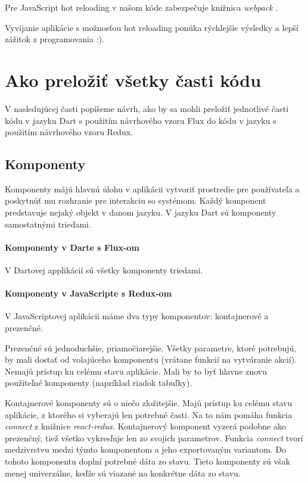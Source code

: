 Pre JavaScript hot reloading v našom kóde zabezpečuje knižnica \emph{webpack} \cite{webpack}.

Vyvíjanie aplikácie s možnosťou hot reloading ponúka rýchlejšie výsledky a lepší zážitok z programovania :).

\section{Ako preložiť všetky časti kódu}

\NEW{}
V nasledujúcej časti popíšeme návrh, ako by sa mohli preložiť jednotlivé časti kódu v jazyku Dart s použitím návrhového vzoru Flux do kódu v jazyku \JS{} s použitím návrhového vzoru Redux.

\subsection{Komponenty}
Komponenty májú hlavnú úlohu v aplikácii vytvoriť prostredie pre používateľa a poskytnúť mu rozhranie pre interakciu so systémom. Každý komponent predstavuje nejaký objekt v danom jazyku. V jazyku Dart sú komponenty samostatnými triedami.



\paragraph{Komponenty v Darte s Flux-om}
V Dartovej applikácií sú všetky komponenty triedami.

\paragraph{Komponenty v JavaScripte s Redux-om}
V JavaScriptovej aplikácii máme dva typy komponentov: kontajnerové a prezenčné. 

Prezenčné sú jednoduchšie, priamočiarejšie. Všetky parametre, ktoré potrebujú, by mali dostať od volajúceho komponentu (vrátane funkcií na vytváranie akcií). Nemajú prístup ku celému stavu aplikácie. Mali by to byť hlavne znovu použiteľné komponenty (napríklad riadok tabuľky).

Kontajnerové komponenty sú o niečo zložitejšie. Majú prístup ku celému stavu aplikácie, z ktorého si vyberajú len potrebné časti. Na to nám pomáha funkcia \emph{connect} z knižnice \emph{react-redux}. Kontajnerový komponent vyzerá podobne ako prezenčný, tiež všetko vykresľuje len zo svojich parametrov. 
Funkcia \emph{connect} tvorí medzivrstvu medzi týmto komponentom a jeho exportovaným variantom. Do tohoto komponentu doplní potrebné dáta zo stavu. Tieto komponenty sú však menej univerzálne, keďže sú viazané na konkrétne dáta zo stavu.

